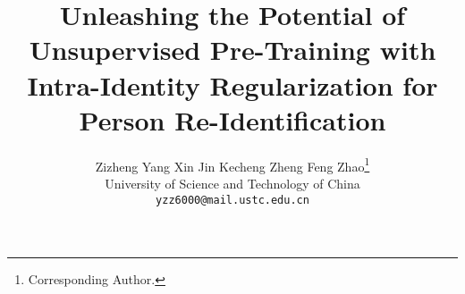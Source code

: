 \documentclass[10pt,twocolumn,letterpaper]{article}
\begin{document}
\title{Unleashing the Potential of Unsupervised Pre-Training with Intra-Identity Regularization for Person Re-Identification}

\author{Zizheng Yang \qquad Xin Jin \qquad Kecheng Zheng \qquad Feng Zhao\thanks{Corresponding Author.}\\
University of Science and Technology of China\\
{\tt\small yzz6000@mail.ustc.edu.cn}
}


\maketitle

\begin{abstract}






\end{abstract}
\end{document}
